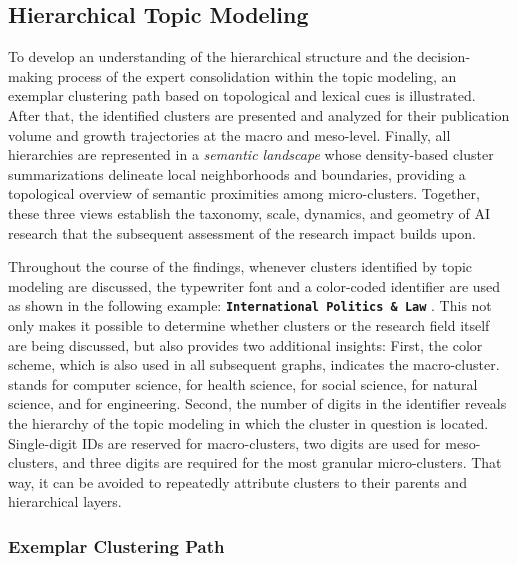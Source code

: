 \documentclass{article}
\begin{document}
	\subsection{Hierarchical Topic Modeling}
	\label{sec:results_topic_modeling}
	
	To develop an understanding of the hierarchical structure and the decision-making process of the expert consolidation within the topic modeling, an exemplar clustering path based on topological and lexical cues is illustrated. After that, the identified clusters are presented and analyzed for their publication volume and growth trajectories at the macro and meso-level. Finally, all hierarchies are represented in a \textit{semantic landscape} whose density-based cluster summarizations delineate local neighborhoods and boundaries, providing a topological overview of semantic proximities among micro-clusters. Together, these three views establish the taxonomy, scale, dynamics, and geometry of AI research that the subsequent assessment of the research impact builds upon.
	
	Throughout the course of the findings, whenever clusters identified by topic modeling are discussed, the typewriter font and a color-coded identifier are used as shown in the following example: \textbf{\texttt{International Politics \& Law}} . This not only makes it possible to determine whether clusters or the research field itself are being discussed, but also provides two additional insights: First, the color scheme, which is also used in all subsequent graphs, indicates the macro-cluster.  stands for computer science,  for health science,  for social science,  for natural science, and  for engineering. Second, the number of digits in the identifier reveals the hierarchy of the topic modeling in which the cluster in question is located. Single-digit IDs are reserved for macro-clusters, two digits are used for meso-clusters, and three digits are required for the most granular micro-clusters. That way, it can be avoided to repeatedly attribute clusters to their parents and hierarchical layers.
	
	\subsubsection{Exemplar Clustering Path}
	\label{exemplar_clustering_path_section}
	
\end{document}
